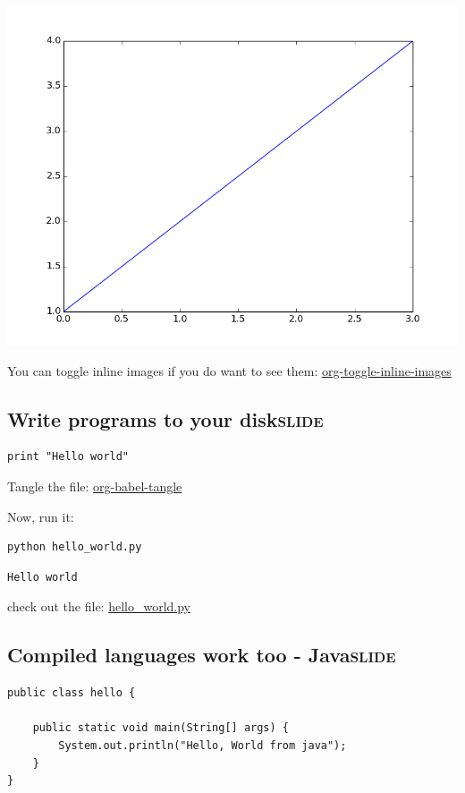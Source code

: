 \documentclass[11pt]{article}
\begin{document}
\includegraphics[width=.9\linewidth]{./images/silly-plot.png}

You can toggle inline images if you do want to see them: \url{org-toggle-inline-images}

\subsection{Write programs to your disk\hfill{}\textsc{slide}}
\label{sec-11-4}

\begin{verbatim}
print "Hello world"
\end{verbatim}

Tangle the file: \url{org-babel-tangle}

Now, run it:

\begin{verbatim}
python hello_world.py
\end{verbatim}

\begin{verbatim}
Hello world
\end{verbatim}


check out the file: \url{hello_world.py}

\subsection{Compiled languages work too - Java\hfill{}\textsc{slide}}
\label{sec-11-5}

\begin{verbatim}
public class hello {

    public static void main(String[] args) {
        System.out.println("Hello, World from java");
    }
}
\end{verbatim}
\end{document}
